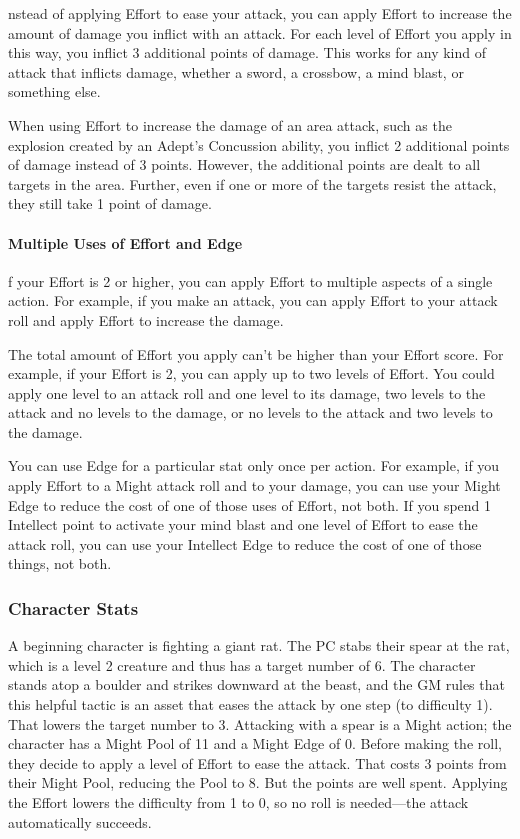 \begin{multicols}{2}
nstead of applying Effort to ease your attack, you can apply Effort to increase the amount of damage you inflict with an attack. For each level of Effort you apply in this way, you inflict 3 additional points of damage. This works for any kind of attack that inflicts damage, whether a sword, a crossbow, a mind blast, or something else.

When using Effort to increase the damage of an area attack, such as the explosion created by an Adept’s Concussion ability, you inflict 2 additional points of damage instead of 3 points. However, the additional points are dealt to all targets in the area. Further, even if one or more of the targets resist the attack, they still take 1 point of damage.

\paragraph{Multiple Uses of Effort and Edge}

f your Effort is 2 or higher, you can apply Effort to multiple aspects of a single action. For example, if you make an attack, you can apply Effort to your attack roll and apply Effort to increase the damage.

The total amount of Effort you apply can’t be higher than your Effort score. For example, if your Effort is 2, you can apply up to two levels of Effort. You could apply one level to an attack roll and one level to its damage, two levels to the attack and no levels to the damage, or no levels to the attack and two levels to the damage.

You can use Edge for a particular stat only once per action. For example, if you apply Effort to a Might attack roll and to your damage, you can use your Might Edge to reduce the cost of one of those uses of Effort, not both. If you spend 1 Intellect point to activate your mind blast and one level of Effort to ease the attack roll, you can use your Intellect Edge to reduce the cost of one of those things, not both.

\subsubsection{Character Stats}

A beginning character is fighting a giant rat. The PC stabs their spear at the rat, which is a level 2 creature and thus has a target number of 6. The character stands atop a boulder and strikes downward at the beast, and the GM rules that this helpful tactic is an asset that eases the attack by one step (to difficulty 1). That lowers the target number to 3. Attacking with a spear is a Might action; the character has a Might Pool of 11 and a Might Edge of 0. Before making the roll, they decide to apply a level of Effort to ease the attack. That costs 3 points from their Might Pool, reducing the Pool to 8. But the points are well spent. Applying the Effort lowers the difficulty from 1 to 0, so no roll is needed—the attack automatically succeeds.


\end{multicols}
